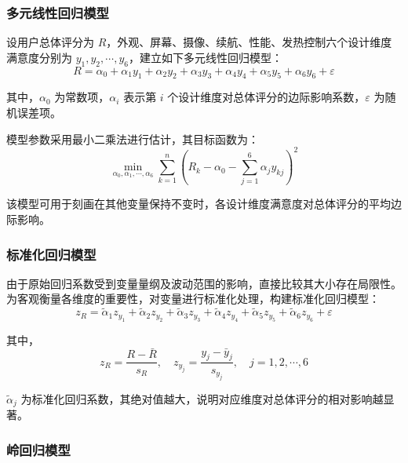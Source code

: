 \documentclass[withoutpreface,bwprint]{cumcmthesis} %
\begin{document}
\subsubsection{多元线性回归模型}

设用户总体评分为 $R$，外观、屏幕、摄像、续航、性能、发热控制六个设计维度满意度分别为 $y_1, y_2, \cdots, y_6$，建立如下多元线性回归模型：
\begin{equation}
R = \alpha_0 + \alpha_1 y_1 + \alpha_2 y_2 + \alpha_3 y_3 + \alpha_4 y_4 + \alpha_5 y_5 + \alpha_6 y_6 + \varepsilon
\end{equation}

其中，$\alpha_0$ 为常数项，$\alpha_i$ 表示第 $i$ 个设计维度对总体评分的边际影响系数，$\varepsilon$ 为随机误差项。

模型参数采用最小二乘法进行估计，其目标函数为\cite{montgomery2012}：
\begin{equation}
\min_{\alpha_0,\alpha_1,\cdots,\alpha_6} \sum_{k=1}^{n} \left( R_k - \alpha_0 - \sum_{j=1}^{6} \alpha_j y_{kj} \right)^2
\end{equation}

该模型可用于刻画在其他变量保持不变时，各设计维度满意度对总体评分的平均边际影响。

\subsubsection{标准化回归模型}  

由于原始回归系数受到变量量纲及波动范围的影响，直接比较其大小存在局限性。为客观衡量各维度的重要性，对变量进行标准化处理，构建标准化回归模型\cite{hastie2009}：
\begin{equation}
z_R = \tilde{\alpha}_1 z_{y_1} + \tilde{\alpha}_2 z_{y_2} + \tilde{\alpha}_3 z_{y_3} + \tilde{\alpha}_4 z_{y_4} + \tilde{\alpha}_5 z_{y_5} + \tilde{\alpha}_6 z_{y_6} + \varepsilon
\end{equation}

其中，
\begin{equation}
z_R = \frac{R - \bar{R}}{s_R}, \quad
z_{y_j} = \frac{y_j - \bar{y}_j}{s_{y_j}}, \quad j = 1,2,\cdots,6
\end{equation}

$\tilde{\alpha}_j$ 为标准化回归系数，其绝对值越大，说明对应维度对总体评分的相对影响越显著。

\subsubsection{岭回归模型}
\end{document}
